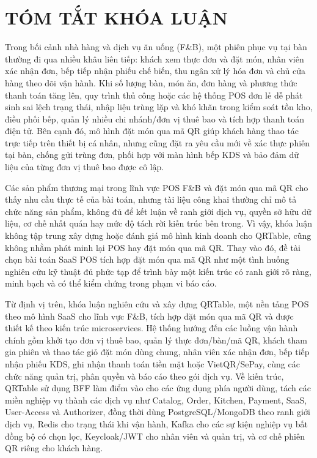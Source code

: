 \chapter*{TÓM TẮT KHÓA LUẬN}

Trong bối cảnh nhà hàng và dịch vụ ăn uống (F\&B), một phiên phục vụ tại bàn thường đi qua nhiều khâu liên tiếp: khách xem thực đơn và đặt món, nhân viên xác nhận đơn, bếp tiếp nhận phiếu chế biến, thu ngân xử lý hóa đơn và chủ cửa hàng theo dõi vận hành. Khi số lượng bàn, món ăn, đơn hàng và phương thức thanh toán tăng lên, quy trình thủ công hoặc các hệ thống POS đơn lẻ dễ phát sinh sai lệch trạng thái, nhập liệu trùng lặp và khó khăn trong kiểm soát tồn kho, điều phối bếp, quản lý nhiều chi nhánh/đơn vị thuê bao và tích hợp thanh toán điện tử. Bên cạnh đó, mô hình đặt món qua mã QR giúp khách hàng thao tác trực tiếp trên thiết bị cá nhân, nhưng cũng đặt ra yêu cầu mới về xác thực phiên tại bàn, chống gửi trùng đơn, phối hợp với màn hình bếp KDS và bảo đảm dữ liệu của từng đơn vị thuê bao được cô lập.

Các sản phẩm thương mại trong lĩnh vực POS F\&B và đặt món qua mã QR cho thấy nhu cầu thực tế của bài toán, nhưng tài liệu công khai thường chỉ mô tả chức năng sản phẩm, không đủ để kết luận về ranh giới dịch vụ, quyền sở hữu dữ liệu, cơ chế nhất quán hay mức độ tách rời kiến trúc bên trong. Vì vậy, khóa luận không tập trung xây dựng hoặc đánh giá mô hình kinh doanh cho QRTable, cũng không nhằm phát minh lại POS hay đặt món qua mã QR. Thay vào đó, đề tài chọn bài toán SaaS POS tích hợp đặt món qua mã QR như một tình huống nghiên cứu kỹ thuật đủ phức tạp để trình bày một kiến trúc có ranh giới rõ ràng, minh bạch và có thể kiểm chứng trong phạm vi báo cáo.

Từ định vị trên, khóa luận nghiên cứu và xây dựng QRTable, một nền tảng POS theo mô hình SaaS cho lĩnh vực F\&B, tích hợp đặt món qua mã QR và được thiết kế theo kiến trúc microservices. Hệ thống hướng đến các luồng vận hành chính gồm khởi tạo đơn vị thuê bao, quản lý thực đơn/bàn/mã QR, khách tham gia phiên và thao tác giỏ đặt món dùng chung, nhân viên xác nhận đơn, bếp tiếp nhận phiếu KDS, ghi nhận thanh toán tiền mặt hoặc VietQR/SePay, cùng các chức năng quản trị, phân quyền và báo cáo theo gói dịch vụ. Về kiến trúc, QRTable sử dụng BFF làm điểm vào cho các ứng dụng phía người dùng, tách các miền nghiệp vụ thành các dịch vụ như Catalog, Order, Kitchen, Payment, SaaS, User-Access và Authorizer, đồng thời dùng PostgreSQL/MongoDB theo ranh giới dịch vụ, Redis cho trạng thái khi vận hành, Kafka cho các sự kiện nghiệp vụ bất đồng bộ có chọn lọc, Keycloak/JWT cho nhân viên và quản trị, và cơ chế phiên QR riêng cho khách hàng.

